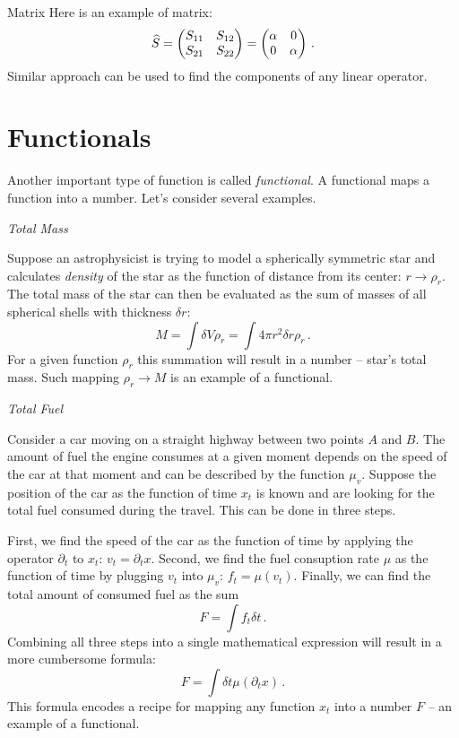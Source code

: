 \begin{mybio}{Matrix}
	Here is an example of matrix:
	\[
	\widehat{S} =
	\begin{pmatrix}
		S_{11} & S_{12}\\
		S_{21} & S_{22}
	\end{pmatrix} =
	\begin{pmatrix}
		\alpha & 0\\
		0 & \alpha
	\end{pmatrix}\,.
	\]
	Similar approach can be used to find the components of any linear operator.
\end{mybio}


\section{Functionals}
Another important type of function is called \emph{functional}. A functional maps a function into a number. Let's consider several examples.

\begin{flushleft}
	{\it Total Mass}
\end{flushleft}
Suppose an astrophysicist is trying to model a spherically symmetric star and calculates \emph{density} of the star as the function of distance from its center: $r\rightarrow\rho_r$. The total mass of the star can then be evaluated as the sum of masses of all spherical shells with thickness $\delta r$:
\[
M = \int \delta V\rho_r=\int 4\pi r^2\delta r\rho_r\,.
\]
For a given function $\rho_r$ this summation will result in a number -- star's total mass. Such mapping $\rho_r\rightarrow M$ is an example of a functional.

\begin{flushleft}
	{\it Total Fuel}
\end{flushleft}
Consider a car moving on a straight highway between two points $A$ and $B$. The amount of fuel the engine consumes at a given moment depends on the speed of the car at that moment and can be described by the function $\mu_v$. Suppose the position of the car as the function of time $x_t$ is known and are looking for the total fuel consumed during the travel. This can be done in three steps. 

First, we find the speed of the car as the function of time by applying the operator $\partial_t$ to $x_t$: $v_t=\partial_{t}x$. Second, we find the fuel consuption rate $\mu$  as the function of time by plugging $v_t$ into $\mu_v$: $f_t = \mu(v_t)$. Finally, we can find the total amount of consumed fuel as the sum
\[
F = \int f_t\delta t\,.
\]
Combining all three steps into a single mathematical expression will result in a more cumbersome formula:
\[
F = \int \delta t\mu(\partial_t x)\,.
\]
This formula encodes a recipe for mapping any function $x_t$ into a number $F$ -- an example of a functional.

